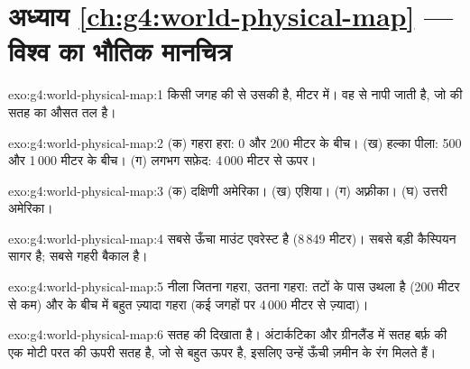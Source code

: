 \section*{अध्याय \ref{ch:g4:world-physical-map} --- विश्व का भौतिक मानचित्र}

\begin{solution}{exo:g4:world-physical-map:1}
किसी जगह की   से उसकी  है, मीटर में। वह  से नापी
जाती है, जो  की सतह का औसत तल है।
\end{solution}

\begin{solution}{exo:g4:world-physical-map:2}
(क) गहरा हरा: 0 और 200 मीटर के बीच। (ख) हल्का पीला: 500 और 1\,000 मीटर के
बीच। (ग) लगभग सफ़ेद: 4\,000 मीटर से ऊपर।
\end{solution}

\begin{solution}{exo:g4:world-physical-map:3}
(क) दक्षिणी अमेरिका। (ख) एशिया। (ग) अफ़्रीका। (घ) उत्तरी अमेरिका।
\end{solution}

\begin{solution}{exo:g4:world-physical-map:4}
सबसे ऊँचा  माउंट एवरेस्ट है (8\,849 मीटर)। सबसे बड़ी  कैस्पियन सागर है;
सबसे गहरी  बैकाल  है।
\end{solution}

\begin{solution}{exo:g4:world-physical-map:5}
नीला जितना गहरा,  उतना गहरा: तटों के पास  उथला है (200 मीटर से कम)
और  के बीच में बहुत ज़्यादा गहरा (कई जगहों पर 4\,000 मीटर से
ज़्यादा)।
\end{solution}

\begin{solution}{exo:g4:world-physical-map:6}
 सतह की  दिखाता है। अंटार्कटिका और ग्रीनलैंड में सतह बर्फ़ की
एक मोटी परत की ऊपरी सतह है, जो  से बहुत ऊपर है, इसलिए उन्हें ऊँची ज़मीन
के रंग मिलते हैं।
\end{solution}

